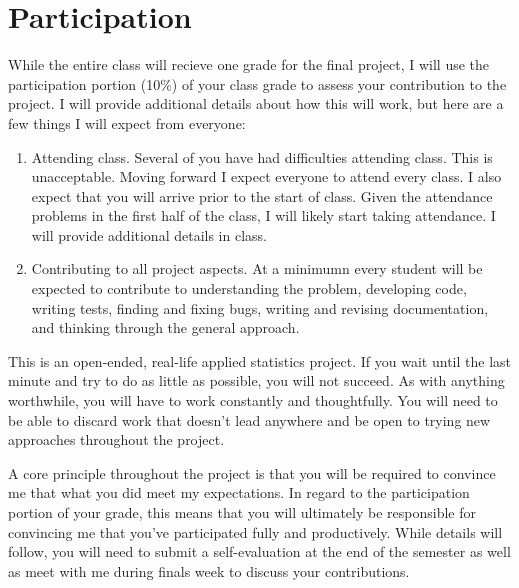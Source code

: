 \documentclass[11pt, oneside]{article}   	%
\begin{document}
\section{Participation}

While the entire class will recieve one grade for the final project, I will use
the participation portion (10\%) of your class grade to assess your
contribution to the project.  I will provide additional details about how this
will work, but here are a few things I will expect from everyone:

\begin{enumerate}
\item Attending class.  Several of you have had difficulties attending class.
  This is unacceptable.  Moving forward I expect everyone to attend every
  class.  I also expect that you will arrive prior to the start of class.
  Given the attendance problems in the first half of the class, I will likely
  start taking attendance.  I will provide additional details in class.
\item Contributing to all project aspects.  At a minimumn every student will
  be expected to contribute to understanding the problem, developing code,
  writing tests, finding and fixing bugs, writing and revising documentation, and
  thinking through the general approach.
\end{enumerate}

This is an open-ended, real-life applied statistics project.  If you wait until
the last minute and try to do as little as possible, you will not succeed.  As
with anything worthwhile, you will have to work constantly and thoughtfully.
You will need to be able to discard work that doesn't lead anywhere and be open
to trying new approaches throughout the project.

A core principle throughout the project is that you will be required to convince
me that what you did meet my expectations.  In regard to the participation portion
of your grade, this means that you will ultimately be responsible for convincing
me that you've participated fully and productively.  While details will follow,
you will need to submit a self-evaluation at the end of the semester as well
as meet with me during finals week to discuss your contributions.
\end{document}
